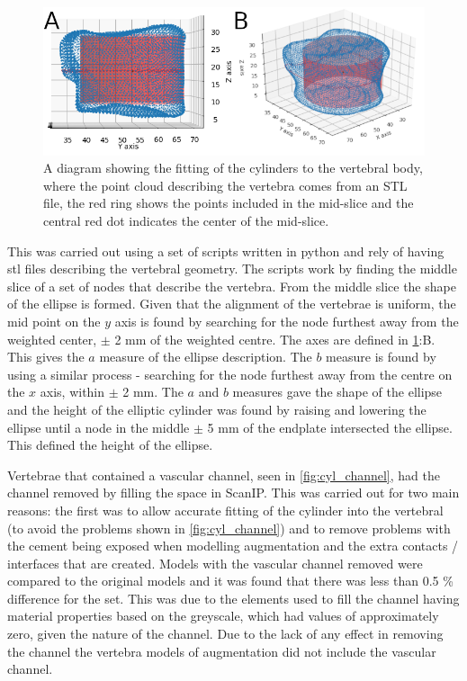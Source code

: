 \begin{figure}[ht!]
  \centering
 
\includegraphics[width=5in]{Chapters/Chapter_HT_images/cyl_fit_ful_iso_both.png}
  \caption{A diagram showing the fitting of the cylinders to the vertebral
body, where the point cloud describing the vertebra comes from an STL file, the
red ring shows the points included in the mid-slice and the central red dot
indicates the center of the mid-slice.}
  \label{fig:cyl_fit}
\end{figure}


This was carried out using a set of scripts written in python and rely of
having stl files describing the vertebral geometry.
The scripts work by finding the middle slice of a set of nodes that describe
the vertebra.
From the middle slice the shape of the ellipse is formed.
Given that the alignment of the vertebrae is uniform, the mid point on the $y$
axis is found by searching for the node furthest away from the weighted center,
$\pm$ 2 mm of the weighted centre. The axes are defined in \cref{fig:cyl_fit}:B.
This gives the $a$ measure of the ellipse description.
The $b$ measure is found by using a similar process - searching for the node
furthest away from the centre on the $x$ axis, within $\pm$ 2 mm.
The $a$ and $b$ measures gave the shape of the ellipse and the height of the
elliptic cylinder was found by raising and lowering the ellipse until a node in
the middle $\pm$ 5 mm of the endplate intersected the ellipse.
This defined the height of the ellipse.

Vertebrae that contained a vascular channel, seen in \cref{fig:cyl_channel},
had the channel removed by filling the space in ScanIP.
This was carried out for two main reasons: the first was to allow accurate
fitting of the cylinder into the vertebral (to avoid the problems shown in
\cref{fig:cyl_channel}) and to remove problems with the cement being exposed
when modelling augmentation and the extra contacts / interfaces that are
created.
Models with the vascular channel removed were compared to the original models
and it was found that there was less than 0.5 \% difference for the set.
This was due to the elements used to fill the channel having material
properties based on the greyscale, which had values of approximately zero,
given the nature of the channel.
Due to the lack of any effect in removing the channel the vertebra models of
augmentation did not include the vascular channel.

